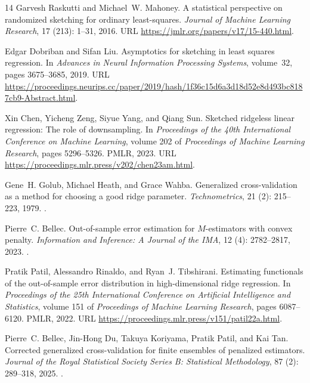 \documentclass{article}
\theoremstyle{plain}
\theoremstyle{definition}
\theoremstyle{definition}
\begin{document}
\begin{thebibliography}{14}
Garvesh Raskutti and Michael~W. Mahoney.
\newblock A statistical perspective on randomized sketching for ordinary least-squares.
\newblock \emph{Journal of Machine Learning Research}, 17 (213): 1--31, 2016.
\newblock URL \url{https://jmlr.org/papers/v17/15-440.html}.

Edgar Dobriban and Sifan Liu.
\newblock Asymptotics for sketching in least squares regression.
\newblock In \emph{Advances in Neural Information Processing Systems}, volume~32, pages 3675--3685, 2019.
\newblock URL \url{https://proceedings.neurips.cc/paper/2019/hash/1f36c15d6a3d18d52e8d493bc8187cb9-Abstract.html}.

Xin Chen, Yicheng Zeng, Siyue Yang, and Qiang Sun.
\newblock Sketched ridgeless linear regression: The role of downsampling.
\newblock In \emph{Proceedings of the 40th International Conference on Machine Learning}, volume 202 of \emph{Proceedings of Machine Learning Research}, pages 5296--5326. PMLR, 2023.
\newblock URL \url{https://proceedings.mlr.press/v202/chen23am.html}.

Gene~H. Golub, Michael Heath, and Grace Wahba.
\newblock Generalized cross-validation as a method for choosing a good ridge parameter.
\newblock \emph{Technometrics}, 21 (2): 215--223, 1979.
\newblock {}.

Pierre~C. Bellec.
\newblock Out-of-sample error estimation for {$M$}-estimators with convex penalty.
\newblock \emph{Information and Inference: A Journal of the IMA}, 12 (4): 2782--2817, 2023.
\newblock {}.

Pratik Patil, Alessandro Rinaldo, and Ryan~J. Tibshirani.
\newblock Estimating functionals of the out-of-sample error distribution in high-dimensional ridge regression.
\newblock In \emph{Proceedings of the 25th International Conference on Artificial Intelligence and Statistics}, volume 151 of \emph{Proceedings of Machine Learning Research}, pages 6087--6120. PMLR, 2022.
\newblock URL \url{https://proceedings.mlr.press/v151/patil22a.html}.

Pierre~C. Bellec, Jin-Hong Du, Takuya Koriyama, Pratik Patil, and Kai Tan.
\newblock Corrected generalized cross-validation for finite ensembles of penalized estimators.
\newblock \emph{Journal of the Royal Statistical Society Series B: Statistical Methodology}, 87 (2): 289--318, 2025.
\newblock {}.


\end{thebibliography}
\end{document}
